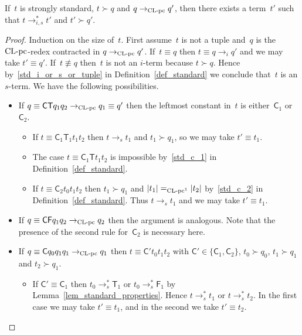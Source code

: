 \documentclass[a4paper,UKenglish]{lipics-v2016}
\newcommand{\Cs}{\mathsf{C}}
\newcommand{\Fs}{\mathsf{F}}
\newcommand{\Ts}{\mathsf{T}}
\newcommand{\contr}{\ensuremath{\rightarrow}}
\newcommand{\erase}[1]{\ensuremath{|#1|}}
\newcommand{\CLCz}{{\mbox{$\text{\rm CL-pc}$}}}
\newcommand{\sCLC}{{\ensuremath{\text{\rm CL-pc}^1}}}
\newcommand{\sCLCz}{\ensuremath{\text{\rm CL-pc}}}
\newcommand{\equiverased}{\succ}
\begin{document}
\begin{lemma}\label{lem_erase_contr}
  If~$t$ is strongly standard, $t \equiverased q$ and
  $q \contr_{\sCLCz} q'$, then there exists a term~$t'$ such that
  $t \to_{i,s}^{*} t'$ and $t' \equiverased q'$.
\end{lemma}

\begin{proof}
  Induction on the size of~$t$. First assume~$t$ is not a tuple
  and~$q$ is the $\CLCz$-redex contracted in $q \contr_{\sCLCz}
  q'$. If~$t \equiv q$ then $t \equiv q \to_i q'$ and we may take
  $t' \equiv q'$. If~$t \not\equiv q$ then~$t$ is not an $i$-term
  because $t \equiverased q$. Hence by~\ref{std_i_or_s_or_tuple} in
  Definition~\ref{def_standard} we conclude that~$t$ is an
  $s$-term. We have the following possibilities.
  \begin{itemize}
  \item If $q \equiv \Cs \Ts q_1 q_2 \to_{\sCLCz} q_1 \equiv q'$ then the
    leftmost constant in~$t$ is either~$\Cs_1$ or~$\Cs_2$.
    \begin{itemize}
    \item If $t \equiv \Cs_1 \Ts_1 t_1 t_2$ then $t \to_s t_1$ and
      $t_1 \equiverased q_1$, so we may take $t' \equiv t_1$.
    \item The case $t \equiv \Cs_1 \Ts t_1 t_2$ is impossible
      by~\ref{std_c_1} in Definition~\ref{def_standard}.
    \item If $t \equiv \Cs_2 t_0 t_1 t_2$ then $t_1 \equiverased q_1$
      and $\erase{t_1} =_{\sCLC} \erase{t_2}$ by~\ref{std_c_2} in
      Definition~\ref{def_standard}. Thus $t \to_s t_1$ and we may
      take $t' \equiv t_1$.
    \end{itemize}
  \item If $q \equiv \Cs \Fs q_1 q_2 \to_{\sCLCz} q_2$ then the
    argument is analogous. Note that the presence of the second rule
    for~$\Cs_2$ is necessary here.
  \item If $q \equiv \Cs q_0 q_1 q_1 \to_{\sCLCz} q_1$ then $t \equiv \Cs'
    t_0 t_1 t_2$ with $\Cs' \in \{\Cs_1,\Cs_2\}$, $t_0 \equiverased q_0$,
    $t_1 \equiverased q_1$ and $t_2 \equiverased q_1$.
    \begin{itemize}
    \item If $\Cs' \equiv \Cs_1$ then $t_0 \to_s^{*} \Ts_1$ or $t_0
      \to_s^{*} \Fs_1$ by Lemma~\ref{lem_standard_properties}. Hence $t
      \to_s^{*} t_1$ or $t \to_s^{*} t_2$. In the first case we may
      take $t' \equiv t_1$, and in the second we take $t' \equiv t_2$.

\end{itemize}
\end{itemize}
\end{proof}
\end{document}
